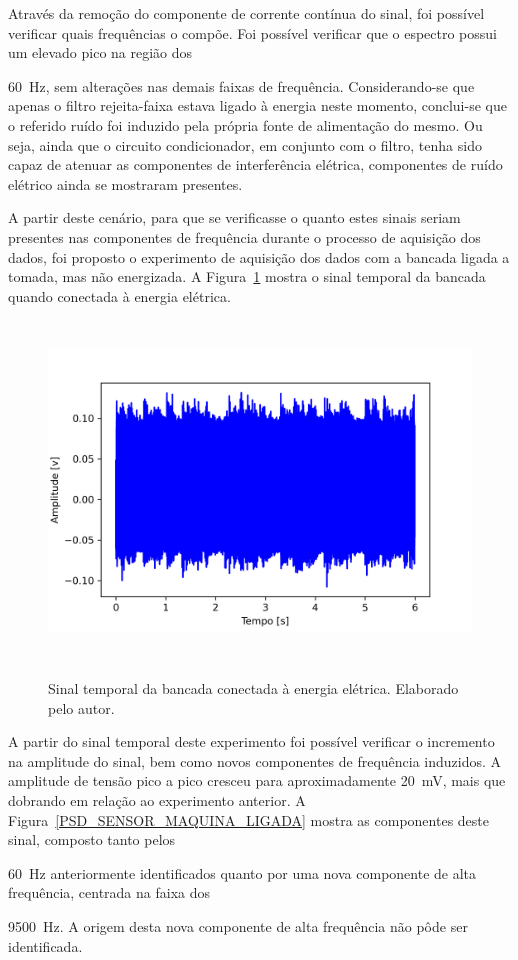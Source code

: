 \documentclass[
	12pt,				
	oneside,			
	a4paper,			
	english,			
	brazil,			
	]{abntex2ppgsi}
\begin{document}
Através da remoção do componente de corrente contínua do sinal, foi possível verificar quais frequências o compõe. Foi possível verificar que o espectro possui um elevado pico na região dos {\SI{60}{\hertz}, sem alterações nas demais faixas de frequência. Considerando-se que apenas o filtro rejeita-faixa estava ligado à energia neste momento, conclui-se que o referido ruído foi induzido pela própria fonte de alimentação do mesmo. Ou seja, ainda que o circuito condicionador, em conjunto com o filtro, tenha sido capaz de atenuar as componentes de interferência elétrica, componentes de ruído elétrico ainda se mostraram presentes. 

A partir deste cenário, para que se verificasse o quanto estes sinais seriam presentes nas componentes de frequência durante o processo de aquisição dos dados, foi proposto o experimento de aquisição dos dados com a bancada ligada a tomada, mas não energizada. A Figura~\ref{maquina_ligada_na_tomada} mostra o sinal temporal da bancada quando conectada à energia elétrica.

\begin{figure}[H]
\centering
\caption {Sinal temporal da bancada conectada à energia elétrica. Elaborado pelo autor.}
\includegraphics[width=\textwidth,height=90mm,keepaspectratio]{Caso0/maquina_ligada_na_tomada}
\label{maquina_ligada_na_tomada}
\end{figure} 

A partir do sinal temporal deste experimento foi possível verificar o incremento na amplitude do sinal, bem como novos componentes de frequência induzidos. A amplitude de tensão pico a pico cresceu para aproximadamente {\SI{20}{\milli\volt}}, mais que dobrando em relação ao experimento anterior. A Figura~\ref{PSD_SENSOR_MAQUINA_LIGADA} mostra as componentes deste sinal, composto tanto pelos {\SI{60}{\hertz} anteriormente identificados quanto por uma nova componente de alta frequência, centrada na faixa dos {\SI{9500}{\hertz}. A origem desta nova componente de alta frequência não pôde ser identificada. 

}}}
\end{document}

